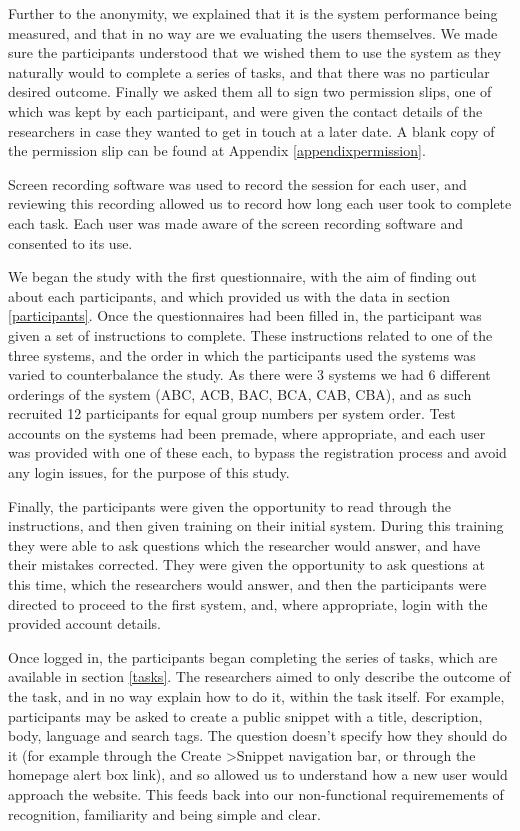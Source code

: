 Further to the anonymity, we explained that it is the system performance being measured, and that in no way are we evaluating the users themselves.
We made sure the participants understood that we wished them to use the system as they naturally would to complete a series of tasks, and that there was no particular desired outcome. 
Finally we asked them all to sign two permission slips, one of which was kept by each participant, and were given the contact details of the researchers in case they wanted to get in touch at a later date. A blank copy of the permission slip can be found at Appendix \ref{appendixpermission}.

Screen recording software was used to record the session for each user, and reviewing this recording allowed us to record how long each user took to complete each task.
Each user was made aware of the screen recording software and consented to its use.

We began the study with the first questionnaire, with the aim of finding out about each participants, and which provided us with the data in section \ref{participants}.
Once the questionnaires had been filled in, the participant was given a set of instructions to complete.
These instructions related to one of the three systems, and the order in which the participants used the systems was varied to counterbalance the study.
As there were 3 systems we had 6 different orderings of the system (ABC, ACB, BAC, BCA, CAB, CBA), and as such recruited 12 participants for equal group numbers per system order.
Test accounts on the systems had been premade, where appropriate, and each user was provided with one of these each, to bypass the registration process and avoid any login issues, for the purpose of this study.

Finally, the participants were given the opportunity to read through the instructions, and then given training on their initial system.
During this training they were able to ask questions which the researcher would answer, and have their mistakes corrected.
They were given the opportunity to ask questions at this time, which the researchers would answer, and then the participants were directed to proceed to the first system, and, where appropriate, login with the provided account details.

Once logged in, the participants began completing the series of tasks, which are available in section \ref{tasks}.
The researchers aimed to only describe the outcome of the task, and in no way explain how to do it, within the task itself.
For example, participants may be asked to create a public snippet with a title, description, body, language and search tags.
The question doesn't specify how they should do it (for example through the Create \textgreater  Snippet navigation bar, or through the homepage alert box link), and so allowed us to understand how a new user would approach the website. This feeds back into our non-functional requiremements of recognition, familiarity and being simple and clear.

